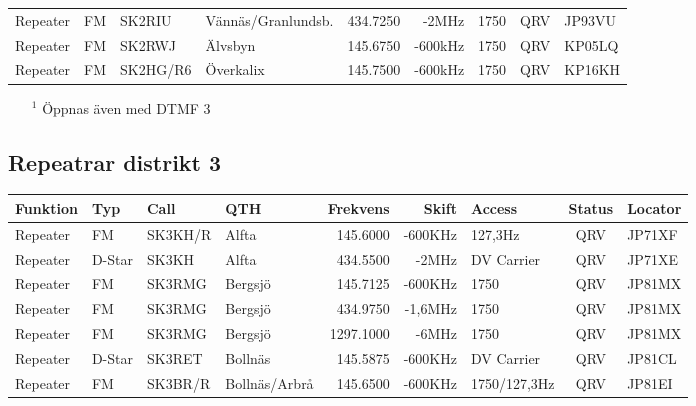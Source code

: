 \begin{landscape}
\begin{longtable}{llllrrlcl}
	Repeater          & FM           & SK2RIU        & Vännäs/Granlundsb. &          434.7250 &          -2MHz & 1750             &       QRV       & JP93VU           \\
	Repeater          & FM           & SK2RWJ        & Älvsbyn            &          145.6750 &        -600kHz & 1750             &       QRV       & KP05LQ           \\
	Repeater          & FM           & SK2HG/R6      & Överkalix          &          145.7500 &        -600kHz & 1750             &       QRV       & KP16KH
\end{longtable}
\begin{itemize}
	\item[$^1$] Öppnas även med DTMF 3
\end{itemize}
\normalsize
\subsection{Repeatrar distrikt 3}
\footnotesize
\begin{longtable}{llllrrlcl}
	\textbf{Funktion} & \textbf{Typ} & \textbf{Call} & \textbf{QTH}     & \textbf{Frekvens} & \textbf{Skift} & \textbf{Access} & \textbf{Status} & \textbf{Locator} \\ \hline
	Repeater          & FM           & SK3KH/R       & Alfta            &          145.6000 &        -600KHz & 127,3Hz         &       QRV       & JP71XF           \\
	Repeater          & D-Star       & SK3KH         & Alfta            &          434.5500 &          -2MHz & DV Carrier      &       QRV       & JP71XE           \\
	Repeater          & FM           & SK3RMG        & Bergsjö          &          145.7125 &        -600KHz & 1750            &       QRV       & JP81MX           \\
	Repeater          & FM           & SK3RMG        & Bergsjö          &          434.9750 &        -1,6MHz & 1750            &       QRV       & JP81MX           \\
	Repeater          & FM           & SK3RMG        & Bergsjö          &         1297.1000 &          -6MHz & 1750            &       QRV       & JP81MX           \\
	Repeater          & D-Star       & SK3RET        & Bollnäs          &          145.5875 &        -600KHz & DV Carrier      &       QRV       & JP81CL           \\
	Repeater          & FM           & SK3BR/R       & Bollnäs/Arbrå    &          145.6500 &        -600KHz & 1750/127,3Hz    &       QRV       & JP81EI           \\

\end{longtable}
\end{landscape}
